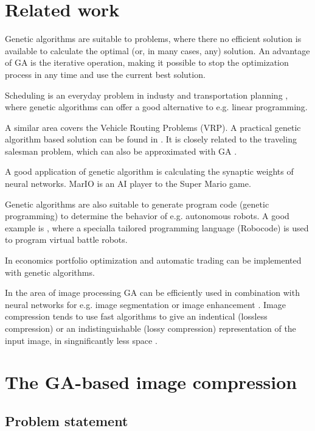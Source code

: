 \documentclass[conference]{IEEEtran}
\begin{document}
\section{Related work}

Genetic algorithms are suitable to problems, where
there no efficient solution is available to calculate
the optimal (or, in many cases, any) solution.
An advantage of GA is the iterative operation, making it possible
to stop the optimization process in any time and use the current
best solution.

Scheduling is an everyday problem in industy \cite{ga-scheduling}
and transportation planning \cite{ga-transport}, where genetic
algorithms can offer a good alternative to e.g. linear programming.

A similar area covers the Vehicle Routing Problems (VRP).
A practical genetic algorithm based solution can be found in \cite{ga-vrp}.
It is closely related to the traveling salesman problem, which
can also be approximated with GA \cite{ga-tsp}.

A good application of genetic algorithm is calculating
the synaptic weights of neural networks. MarIO \cite{mar-io}
is an AI player to the Super Mario game.

Genetic algorithms are also suitable to generate program code
(genetic programming) to determine the behavior of e.g.
autonomous robots. A good example is \cite{ga-robocode},
where a specialla tailored programming language (Robocode)
is used to program virtual battle robots.

In economics portfolio optimization \cite{ga-portfolio}
and automatic trading \cite{ga-trading}
can be implemented with genetic algorithms.

In the area of image processing GA can be
efficiently used in combination with neural networks for e.g.
image segmentation \cite{ga-imgseg} or image enhancement \cite{ga-imgenh}.
Image compression tends to use fast algorithms to give an
indentical (lossless compression) or an indistinguishable
(lossy compression) representation of the input image,
in singnificantly less space \cite{image-proc}.

\section{The GA-based image compression}

\subsection{Problem statement}
\end{document}

